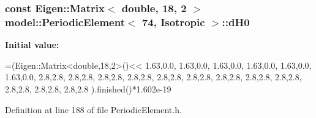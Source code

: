 \subsubsection[{d\+H0}]{\setlength{\rightskip}{0pt plus 5cm}const Eigen\+::\+Matrix$<$ double, 18, 2 $>$ {\bf model\+::\+Periodic\+Element}$<$ 74, {\bf Isotropic} $>$\+::d\+H0\hspace{0.3cm}{\ttfamily [static]}}\label{structmodel_1_1_periodic_element_3_0174_00_01_isotropic_01_4_adc67798e64c421b46893b4cf39eb9f29}
{\bfseries Initial value\+:}
\begin{DoxyCode}
=(Eigen::Matrix<double,18,2>()<<
                                                                         1.63,0.0, 
                                                                         1.63,0.0, 
                                                                         1.63,0.0, 
                                                                         1.63,0.0, 
                                                                         1.63,0.0, 
                                                                         1.63,0.0, 
                                                                         2.8,2.8, 
                                                                         2.8,2.8, 
                                                                         2.8,2.8, 
                                                                         2.8,2.8, 
                                                                         2.8,2.8, 
                                                                         2.8,2.8, 
                                                                         2.8,2.8, 
                                                                         2.8,2.8, 
                                                                         2.8,2.8, 
                                                                         2.8,2.8, 
                                                                         2.8,2.8, 
                                                                         2.8,2.8 
                                                                         ).finished()*1.602e-19
\end{DoxyCode}


Definition at line 188 of file Periodic\+Element.\+h.

\hypertarget{structmodel_1_1_periodic_element_3_0174_00_01_isotropic_01_4_aebf78eba503b1b46147d6482dbd44be3}{}
